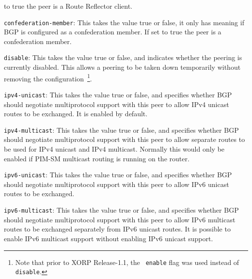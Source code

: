 \begin{description}
\begin{description}
to {\stt true} the peer is a Route Reflector client.
\item{\tt confederation-member}: This takes the value {\stt true} or
{\stt false}, it only has meaning if BGP is configured as a
confederation member. If set to {\stt true} the peer is a
confederation member.
\item{\tt disable}: This takes the value {\stt true} or {\stt false},
  and indicates whether the peering is currently disabled.  This allows
  a peering to be taken down temporarily without removing the
  configuration~\footnote{Note that prior to XORP Release-1.1, the {\tt
  enable} flag was used instead of {\tt disable}.}.
\item{\tt ipv4-unicast}: This takes the value {\stt true} or {\stt false},
  and specifies whether BGP should
  negotiate multiprotocol support with this peer to allow IPv4 unicast
  routes to be exchanged. It is enabled by default.
\item{\tt ipv4-multicast}: This takes the value {\stt true} or {\stt false},
  and specifies whether BGP should
  negotiate multiprotocol support with this peer to allow separate
  routes to be used for IPv4 unicast and IPv4 multicast.  Normally
  this would only be enabled if PIM-SM multicast routing is running on
  the router.
\item{\tt ipv6-unicast}: This takes the value {\stt true} or {\stt false},
  and specifies whether BGP should
  negotiate multiprotocol support with this peer to allow IPv6 unicast
  routes to be exchanged.
\item{\tt ipv6-multicast}: This takes the value {\stt true} or {\stt false},
  and specifies whether BGP should
  negotiate multiprotocol support with this peer to allow IPv6
  multicast routes to be exchanged separately from IPv6 unicast
  routes.  It is possible to enable IPv6 multicast support without
  enabling IPv6 unicast support.
\end{description}
\end{description}

